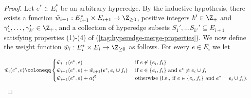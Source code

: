 \begin{proof}
    Let $e^* \in E_i^*$ be an arbitrary hyperedge.
    By the inductive hypothesis, there exists a function $\Tilde{w}_{i+1}:E^*_{i+1}\times E_{i+1} \rightarrow \Z_{\geq 0}$, positive integers $k' \in \Z_+$ and $\gamma_1', \ldots, \gamma_{k'}' \in \Z_+$, and a collection of hyperedge subsets $S_1', \ldots S_{k'}' \subseteq E_{i+1}$ satisfying properties (1)-(4) of (\ref{tag:hyperedge-merge-properties}).
    We now define the weight function $\Tilde{w}_i:E^*_{i}\times E_{i} \rightarrow \Z_{\geq 0}$ as follows. 
    For every $e \in E_i$ we let



$$\Tilde{w}_i(e^*, e) \coloneqq  \begin{cases}
        \Tilde{w}_{i+1}(e^*, e)&\text{ if } e \not\in \{e_i, f_i\}\\
        \Tilde{w}_{i+1}(e^*, e) + \Tilde{w}_{i+1}(e^*, e_i \cup f_i)&\text{ if } e \in \{e_i, f_i\} \text{ and } e^* \not = e_i\cup f_i\\
        \Tilde{w}_{i+1}(e^*, e) + \alpha_i^R& \text{ otherwise (i.e., if $e \in \{e_i, f_i\}$ and $e^* = e_i \cup f_i$).}
    \end{cases}$$


\end{proof}
